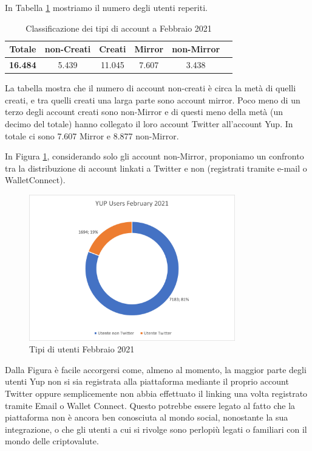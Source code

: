 In Tabella \ref{table:usersClassification} mostriamo il numero degli utenti reperiti.

\begin{table}[h!]
\centering
\begin{tabular}{ |c|c|c|c|c|c| }
 \hline
 \textbf{Totale} & non-Creati & Creati & Mirror & non-Mirror\\
 \hline
 \textbf{16.484} & 5.439 & 11.045 & 7.607 & 3.438\\
 \hline
\end{tabular}
\caption{Classificazione dei tipi di account a Febbraio 2021}
\label{table:usersClassification}
\end{table}

La tabella mostra che il numero di account non-creati è circa la metà di quelli creati, e tra quelli creati una larga parte sono account mirror.
Poco meno di un terzo degli account creati sono non-Mirror e di questi meno della metà (un decimo del totale) hanno collegato il loro account Twitter all'account Yup.
In totale ci sono 7.607 Mirror e 8.877 non-Mirror.

In Figura \ref{fig:usersClassification2}, considerando solo gli account non-Mirror, proponiamo un confronto tra la distribuzione di account linkati a Twitter e non (registrati tramite e-mail o WalletConnect).

\begin{figure}[t]
    \centering
    \includegraphics[width=0.8\textwidth]{graphs/users_feb.png}
    \caption{Tipi di utenti Febbraio 2021}
    \label{fig:usersClassification2}
\end{figure}

Dalla Figura è facile accorgersi come, almeno al momento, la maggior parte degli utenti Yup non si sia registrata alla piattaforma mediante il proprio account Twitter oppure semplicemente non abbia effettuato il linking una volta registrato tramite Email o Wallet Connect.
Questo potrebbe essere legato al fatto che la piattaforma non è ancora ben conosciuta al mondo social, nonostante la sua integrazione, o che gli utenti a cui si rivolge sono perlopiù legati o familiari con il mondo delle criptovalute.


